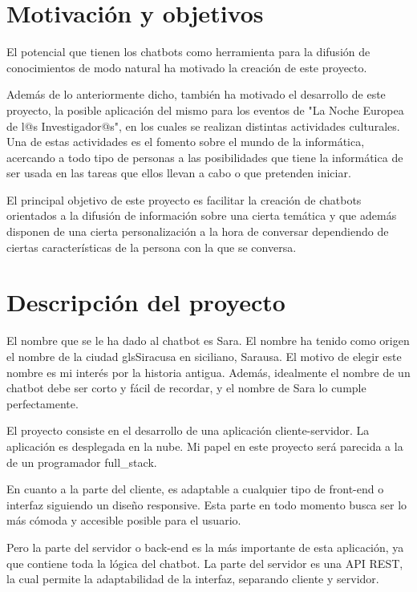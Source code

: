 \section{Motivación y objetivos}

El potencial que tienen los chatbots como herramienta para la difusión de conocimientos de modo natural ha motivado la creación de este proyecto.

Además de lo anteriormente dicho, también ha motivado el desarrollo de este proyecto, la posible aplicación del mismo para los eventos de "La Noche Europea de l@s Investigador@s", en los cuales se realizan distintas actividades culturales. Una de estas actividades es el fomento sobre el mundo de la informática, acercando a todo tipo de personas a las posibilidades que tiene la informática de ser usada en las tareas que ellos llevan a cabo o que pretenden iniciar.

El principal objetivo de este proyecto es facilitar la creación de chatbots orientados a la difusión de información sobre una cierta temática y que además disponen de una cierta personalización a la hora de conversar dependiendo de ciertas características de la persona con la que se conversa.

\section{Descripción del proyecto}

El nombre que se le ha dado al chatbot es Sara. El nombre ha tenido como origen el nombre de la ciudad gls{Siracusa} en siciliano, Sarausa. El motivo de elegir este nombre es mi interés por la historia antigua. Además, idealmente el nombre de un chatbot debe ser corto y fácil de recordar, y el nombre de Sara lo cumple perfectamente.

El proyecto consiste en el desarrollo de una aplicación cliente-servidor. La aplicación es desplegada en la nube. Mi papel en este proyecto será parecida a la de un programador \gls{full_stack}.

En cuanto a la parte del cliente, es adaptable a cualquier tipo de \gls{front-end} o interfaz siguiendo un diseño \gls{responsive}. Esta parte en todo momento busca ser lo más cómoda y accesible posible para el usuario.

Pero la parte del servidor o \gls{back-end} es la más importante de esta aplicación, ya que contiene toda la lógica del chatbot. La parte del servidor es una \gls{API REST}, la cual permite la adaptabilidad de la interfaz, separando cliente y servidor.

